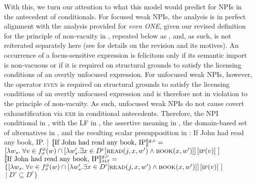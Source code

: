 With this, we turn our attention to what this model would predict for NPIs in the antecedent of conditionals. For focused weak NPIs, the analysis is in perfect alignment with the analysis provided for \textit{even \MakeUppercase{one}}, given our revised definition for the principle of non-vacuity in , repeated below as , and, as such, is not reiterated separately here (see  for details on the revision and its motives).
\ex
{}
An occurrence of a focus-sensitive expression is felicitous only if its semantic import is non-vacuous or if it is required on structural grounds to satisfy the licensing conditions of an overtly unfocused expression.
\xe
For unfocused weak NPIs, however, the operator {\scshape even} is required on structural grounds to satisfy the licensing conditions of an overtly unfocused expression and is therefore not in violation to the principle of non-vacuity. As such, unfocused weak NPIs do not cause covert exhaustification via {\scshape exh} in conditional antecedents. Therefore, the NPI conditional in , with the LF in , the assertive meaning in , the domain-based set of alternatives in , and the resulting scalar presupposition in :
\pex\label{ex:ds-neutral-conditional-any}
\a If John had read any book, IP.
\a[] [even\textsubscript{C} [If John had read any book, IP]]
\a $\intension[g,c]{If John had read any book, IP}=$\\$[\lambda w_s.\hspace{1mm}\forall v\in f^{\phi}_\sigma(w)\cap [\lambda w'_s.\exists{x\in{D^c}}[\predicate{read}(j,x,w')\land\predicate{book}(x,w')]]\hspace{0.5mm}[\predicate{ip}(v)]\hspace{1mm}]$
\a $\intension[g,c]{If John had read any book, IP}_{\text{\scshape alt}}=$\\$\{[\lambda w_s.\hspace{1mm}\forall v\in f^{\phi}_\sigma(w)\cap [\lambda w'_s.\exists{x\in{D'}}[\predicate{read}(j,x,w')\land\predicate{book}(x,w')]]\hspace{0.5mm}[\predicate{ip}(v)]\hspace{1mm}]$\\\emptyfill$~|~D'\subseteq D^c\}$
